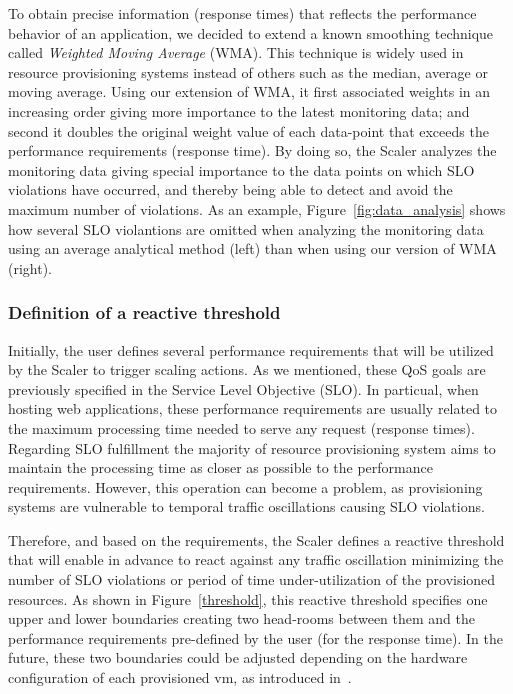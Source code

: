 To obtain precise information (response times) that reflects the performance behavior of an application, we decided to extend a known smoothing technique called \emph{Weighted Moving Average} (WMA). This technique is widely used in resource provisioning systems instead of others such as the median, average or moving average. Using our extension of WMA, it first associated weights in an increasing order giving more importance to the latest monitoring data; and second it doubles the original weight value of each data-point that exceeds the performance requirements (response time). By doing so, the Scaler analyzes the monitoring data giving special importance to the data points on which SLO violations have occurred, and thereby being able to detect and avoid the maximum number of violations. As an example, Figure~\ref{fig:data_analysis} shows how several SLO violantions are omitted when analyzing the monitoring data using an average analytical method (left) than when using our version of WMA (right).

\subsubsection{Definition of a reactive threshold}


Initially, the user defines several performance requirements that will be utilized by the Scaler to trigger scaling actions. As we mentioned, these QoS goals are previously specified in the Service Level Objective (SLO). In particual, when hosting web applications, these performance requirements are usually related to the maximum processing time needed to serve any request (response times). Regarding SLO fulfillment the majority of resource provisioning system aims to maintain the processing time as closer as possible to the performance requirements. However, this operation can become a problem, as provisioning systems are vulnerable to temporal traffic oscillations causing SLO violations.

Therefore, and based on the requirements, the Scaler defines a reactive threshold that will enable in advance to react against any traffic oscillation minimizing the number of SLO violations or period of time under-utilization of the provisioned resources. As shown in Figure~\ref{threshold}, this reactive threshold specifies one upper and lower boundaries creating two head-rooms between them and the performance requirements pre-defined by the user (for the response time). In the future, these two boundaries could be adjusted depending on the hardware configuration of each provisioned vm, as introduced in~\cite{beloglazov_adaptive_2010}.  


